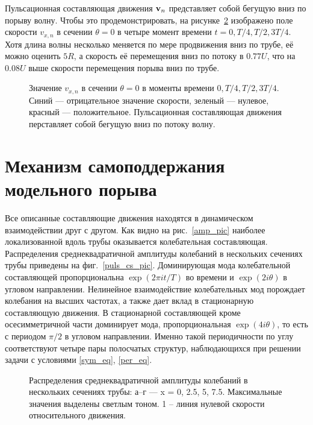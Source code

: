 Пульсационная составляющая движения $\mathbf{v}_n$ представляет собой бегущую вниз по порыву волну. Чтобы это продемонстрировать, на рисунке~\ref{puls_ls_pic} изображено поле скорости $v_{x,n}$ в сечении $\theta = 0$ в четыре момент времени $t=0, T/4, T/2, 3T/4$. Хотя длина волны несколько меняется по мере продвижения вниз по трубе, её можно оценить $5R$, а скорость её перемещения вниз по потоку в $0.77U$, что на $0.08U$ выше скорости перемещения порыва вниз по трубе.  


\begin{figure}[h]
\caption{Значение $v_{x,n}$ в сечении $\theta=0$ в моменты времени $0, T/4, T/2, 3T/4$. Синий --- отрицательное значение скорости, зеленый --- нулевое, красный --- положительное. Пульсационная составляющая движения перставляет собой бегущую вниз по потоку волну. }
\label{puls_ls_pic}
\end{figure}


\section{Механизм самоподдержания модельного порыва} 

Все описанные составляющие движения находятся в динамическом взаимодействии друг с другом. Как видно на рис.~\ref{amp_pic} наиболее локализованной вдоль трубы оказывается колебательная составляющая. Распределения среднеквадратичной амплитуды колебаний в нескольких сечениях трубы приведены на фиг.~\ref{puls_cs_pic}. Доминирующая мода колебательной составляющей пропорциональна $\exp(2\pi it/T)$ во времени и $\exp(2i\theta)$ в угловом направлении. Нелинейное взаимодействие колебательных мод порождает колебания на высших частотах, а также дает вклад в стационарную составляющую движения. В стационарной составляющей кроме осесимметричной части доминирует мода, пропорциональная $\exp(4i\theta)$, то есть с периодом $\pi/2$ в угловом направлении. Именно такой периодичности по углу соответствуют четыре пары полосчатых структур, наблюдающихся при решении задачи с условиями \eqref{sym_eq}, \eqref{per_eq}.

\begin{figure}[h]
\caption{Распределения среднеквадратичной амплитуды колебаний в нескольких сечениях трубы: а--г --- x = 0, 2.5, 5, 7.5. Максимальные значения выделены светлым
тоном. 1 – линия нулевой скорости относительного движения.}
\label{puls_ls_pic}
\end{figure}

